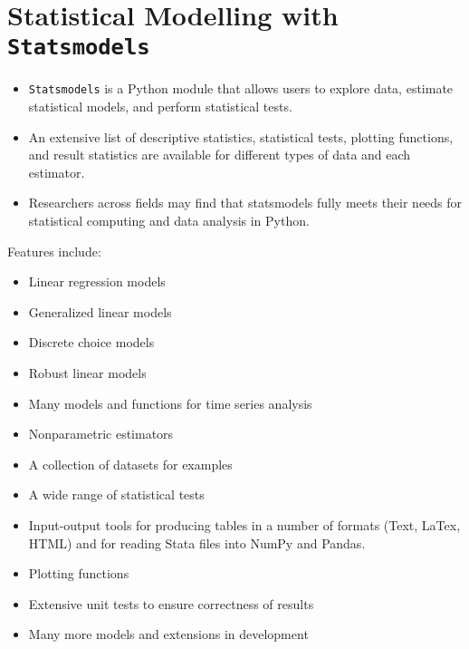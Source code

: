\documentclass[KSmain.tex]{subfiles}
\begin{document}
 
	\large
\section*{Statistical Modelling with \texttt{Statsmodels}}
\begin{itemize}
\item \texttt{Statsmodels} is a Python module that allows users to explore data, estimate statistical models, and perform statistical tests. 
\item An extensive list of descriptive statistics, statistical tests, plotting functions, and result statistics are available for different types of 
data and each estimator. 
\item Researchers across fields may find that statsmodels fully meets their needs for statistical computing and data analysis 
in Python. 
\end{itemize}

Features include:


\begin{itemize}
	
	\item Linear regression models
	
	\item Generalized linear models
	
	\item Discrete choice models
	
	\item Robust linear models
	
	\item Many models and functions for time series analysis
	
	\item Nonparametric estimators
	
	\item A collection of datasets for examples
	
	\item A wide range of statistical tests
	
	\item Input-output tools for producing tables in a number of formats (Text, LaTex, HTML) and for reading Stata files into NumPy and Pandas.
	
	\item Plotting functions
	
	\item Extensive unit tests to ensure correctness of results
	
	\item Many more models and extensions in development
	
\end{itemize}
\end{document}

